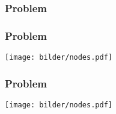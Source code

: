 \begin{frame}
	\frametitle{Problem}
		\centering
		\setlength{\fboxsep}{0.5pt}
\end{frame}


\begin{frame}
\frametitle{Problem}
\centering
\setlength{\fboxsep}{0.5pt}
\setlength{\fboxrule}{0.5pt}
\texttt{[image: bilder/nodes.pdf]}
\end{frame}

\begin{frame}
\frametitle{Problem}
\centering
\setlength{\fboxsep}{0.5pt}
\setlength{\fboxrule}{0.5pt}
\texttt{[image: bilder/nodes.pdf]}
\end{frame}